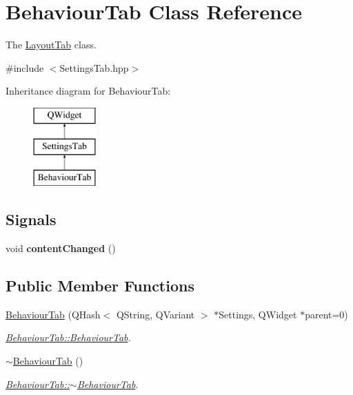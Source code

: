 \hypertarget{classBehaviourTab}{\section{Behaviour\+Tab Class Reference}
\label{classBehaviourTab}
}


The \hyperlink{classLayoutTab}{Layout\+Tab} class.  




{\ttfamily \#include $<$Settings\+Tab.\+hpp$>$}

Inheritance diagram for Behaviour\+Tab\+:\begin{figure}[H]
\begin{center}
\leavevmode
\includegraphics[height=3.000000cm]{classBehaviourTab}
\end{center}
\end{figure}
\subsection*{Signals}
\begin{DoxyCompactItemize}
\item 
\hypertarget{classSettingsTab_ab72744b5433a111f3e79da0ef1d9af74}{void {\bfseries content\+Changed} ()}\label{classSettingsTab_ab72744b5433a111f3e79da0ef1d9af74}

\end{DoxyCompactItemize}
\subsection*{Public Member Functions}
\begin{DoxyCompactItemize}
\item 
\hyperlink{classBehaviourTab_aef517fdf230f2ec647a314f61c435c16}{Behaviour\+Tab} (Q\+Hash$<$ Q\+String, Q\+Variant $>$ $\ast$Settings, Q\+Widget $\ast$parent=0)
\begin{DoxyCompactList}\small\item\em \hyperlink{classBehaviourTab_aef517fdf230f2ec647a314f61c435c16}{Behaviour\+Tab\+::\+Behaviour\+Tab}. \end{DoxyCompactList}\item 
\hyperlink{classBehaviourTab_abe229e738294990a30a9c0b3fde8d482}{$\sim$\+Behaviour\+Tab} ()
\begin{DoxyCompactList}\small\item\em \hyperlink{classBehaviourTab_abe229e738294990a30a9c0b3fde8d482}{Behaviour\+Tab\+::$\sim$\+Behaviour\+Tab}. \end{DoxyCompactList}\end{DoxyCompactItemize}
